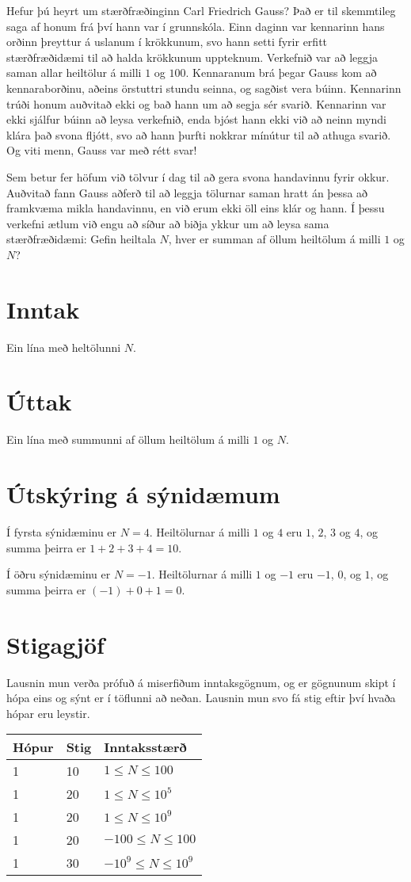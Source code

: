 
Hefur þú heyrt um stærðfræðinginn Carl Friedrich Gauss? Það er til skemmtileg
saga af honum frá því hann var í grunnskóla. Einn daginn var kennarinn hans
orðinn þreyttur á uslanum í krökkunum, svo hann setti fyrir erfitt
stærðfræðidæmi til að halda krökkunum uppteknum. Verkefnið var að leggja saman
allar heiltölur á milli $1$ og $100$. Kennaranum brá þegar Gauss kom að
kennaraborðinu, aðeins örstuttri stundu seinna, og sagðist vera búinn.
Kennarinn trúði honum auðvitað ekki og bað hann um að segja sér svarið.
Kennarinn var ekki sjálfur búinn að leysa verkefnið, enda bjóst hann ekki við
að neinn myndi klára það svona fljótt, svo að hann þurfti nokkrar mínútur til
að athuga svarið. Og viti menn, Gauss var með rétt svar!

Sem betur fer höfum við tölvur í dag til að gera svona handavinnu fyrir okkur.
Auðvitað fann Gauss aðferð til að leggja tölurnar saman hratt án þessa að
framkvæma mikla handavinnu, en við erum ekki öll eins klár og hann. Í þessu
verkefni ætlum við engu að síður að biðja ykkur um að leysa sama
stærðfræðidæmi: Gefin heiltala $N$, hver er summan af öllum heiltölum á milli
$1$ og $N$?

\section*{Inntak}
Ein lína með heltölunni $N$.

\section*{Úttak}
Ein lína með summunni af öllum heiltölum á milli $1$ og $N$.

\section*{Útskýring á sýnidæmum}
Í fyrsta sýnidæminu er $N = 4$. Heiltölurnar á milli $1$ og $4$ eru $1$, $2$,
$3$ og $4$, og summa þeirra er $1+2+3+4=10$.

Í öðru sýnidæminu er $N = -1$. Heiltölurnar á milli $1$ og $-1$ eru $-1$, $0$,
og $1$, og summa þeirra er $(-1)+0+1 = 0$.

\section*{Stigagjöf}
Lausnin mun verða prófuð á miserfiðum inntaksgögnum, og er gögnunum skipt í
hópa eins og sýnt er í töflunni að neðan. Lausnin mun svo fá stig eftir því
hvaða hópar eru leystir.

\begin{tabular}{|l|l|l|}
\hline
Hópur & Stig & Inntaksstærð \\ \hline
1 & 10  & $1\leq N\leq 100$ \\ \hline
1 & 20  & $1\leq N\leq 10^5$ \\ \hline
1 & 20  & $1\leq N\leq 10^9$ \\ \hline
1 & 20  & $-100\leq N\leq 100$ \\ \hline
1 & 30  & $-10^9\leq N\leq 10^9$ \\ \hline
\end{tabular}
